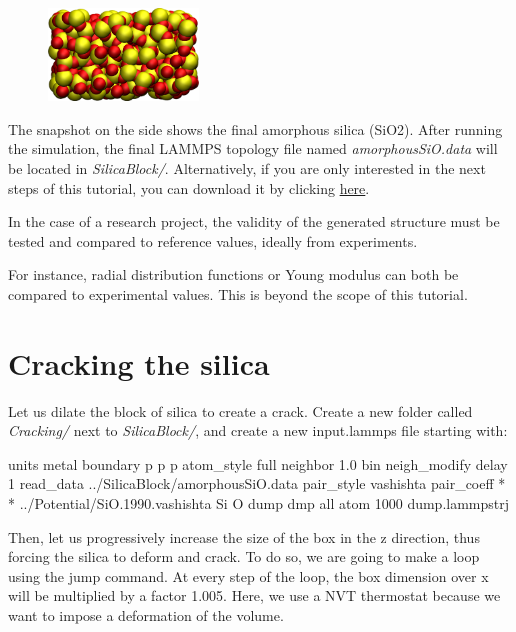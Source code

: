 \hspace{-0.45cm}\begin{figure}
\includegraphics[width=4cm]{tutorials/level3/water-adsorption-in-silica/generated-silica-light.png}
\end{figure}

\noindent The snapshot on the side shows the final amorphous silica (SiO2).
After running the simulation, the final LAMMPS topology file named
\textit{amorphousSiO.data} will be located in \textit{SilicaBlock/}. Alternatively, if you are only interested in the
next steps of this tutorial, you can download it by clicking
\href{../../../../../inputs/level3/water-adsorption-in-silica/SilicaBlock/amorphousSiO.data}{here}.

\begin{tcolorbox}[colback=mylightblue!5!white,colframe=mylightblue!75!black,title=Tip for research project]
In the case of a research project, the validity of the generated
structure must be tested and compared to reference values, ideally from
experiments. 

For instance, radial distribution functions or Young modulus
can both be compared to experimental values. This is beyond the
scope of this tutorial.
\end{tcolorbox}

\noindent \section{Cracking the silica}

Let us dilate the block of silica to create a
crack. Create a new folder called \textit{Cracking/} next to \textit{SilicaBlock/}, and create a
new input.lammps file starting with:

\begin{lcverbatim}
units metal
boundary p p p
atom_style full
neighbor 1.0 bin
neigh_modify delay 1
read_data ../SilicaBlock/amorphousSiO.data
pair_style vashishta
pair_coeff * * ../Potential/SiO.1990.vashishta Si O
dump dmp all atom 1000 dump.lammpstrj
\end{lcverbatim}

\noindent Then, let us progressively increase the size of the
box in the z direction, thus forcing the silica to deform and crack. To do
so, we are going to make a loop using the jump command. At
every step of the loop, the box dimension over x will
be multiplied by a factor 1.005. Here, we use a NVT
thermostat because we want to impose a deformation of the
volume.

